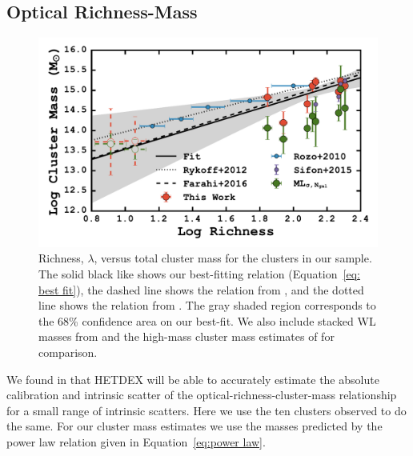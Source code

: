 \subsection{Optical Richness-Mass}
\begin{figure}
	\includegraphics[width=\textwidth]{./figures2/massRichness.pdf} 
	\caption{Richness, $\lambda$, versus total cluster mass for the clusters in our sample. The solid black like shows our best-fitting relation (Equation~\protect\ref{eq: best fit}), the dashed line shows the relation from \protect\cite{Farahi2016}, and the dotted line shows the relation from \protect\cite{Rykoff2012}. The gray shaded region corresponds to the 68\% confidence area on our best-fit. We also include stacked WL masses from \protect\cite{Rozo2010} and the high-mass cluster mass estimates of \protect\cite{Sifon2015} for comparison.}
\label{fig:massRichness} 
\end{figure}

We found in  that HETDEX will be able to accurately estimate the absolute calibration and intrinsic scatter of the optical-richness-cluster-mass relationship for a small range of intrinsic scatters. Here we use the ten clusters observed to do the same. For our cluster mass estimates we use the masses predicted by the power law relation given in Equation~\ref{eq:power law}. 

